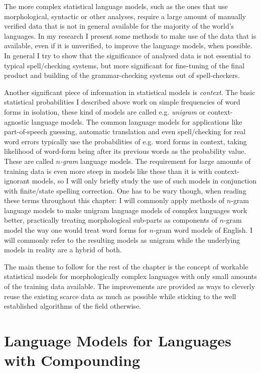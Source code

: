 \documentclass[officiallayout]{unihelcompling}
\begin{document}
The more complex statistical language models, such as the ones that use
morphological, syntactic or other analyses, require a large amount of manually
verified data that is not in general available for the majority of the world's
languages. In my research I present some methods to make use of the data that
is available, even if it is unverified, to improve the language models, when
possible. In general I try to show that the significance of analysed data is
not essential to typical spell\-/checking systems, but more significant for
fine-tuning of the final product and building of the grammar-checking systems
out of spell-checkers.

Another significant piece of information in statistical models is
\emph{context}. The basic statistical probabilities I described above work on
simple frequencies of word forms in isolation, these kind of models are called
e.g. \emph{unigram} or context-agnostic language models. The common language
models for applications like part-of-speech guessing, automatic translation and
even spell\-/checking for real word errors typically use the probabilities of
e.g.  word forms in context, taking likelihood of word-form being after its
previous words as the probability value. These are called \emph{\(n\)-gram}
language models.  The requirement for large amounts of training data is even
more steep in models like these than it is with context-ignorant models, so I
will only briefly study the use of such models in conjunction with finite\-/state
spelling correction. One has to be wary though, when reading these terms
throughout this chapter: I will commonly apply methods of \(n\)-gram language
models to make unigram language models of complex languages work better,
practically treating morphological sub-parts as components of \(n\)-gram model the
way one would treat word forms for \(n\)-gram word models of English. I will
commonly refer to the resulting models as unigram while the underlying models
in reality are a hybrid of both.

The main theme to follow for the rest of the chapter is the concept of workable
statistical models for morphologically complex languages with only small
amounts of the training data available. The improvements are provided as ways
to cleverly reuse the existing scarce data as much as possible while sticking
to the well established algorithms of the field otherwise.

\section{Language Models for Languages with Compounding}
\label{sec:compounding}
\end{document}
